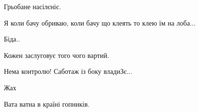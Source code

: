 \begin{itemize}
 
Грьобане насілєніє.

 
Я коли бачу обриваю, коли бачу що клеять то клею їм на лоба...

 
Біда..

 
Кожен заслуговує того чого вартий.

 
Нема контролю! Саботаж із боку владиЗє...

 
Жах

 
Вата ватна в країні гопників.


\end{itemize}
